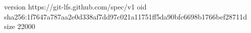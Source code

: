 version https://git-lfs.github.com/spec/v1
oid sha256:1f7647a787aa2e0d338af7dd97c021a11751ff5da90bfc6698b1766bef28711d
size 22000
